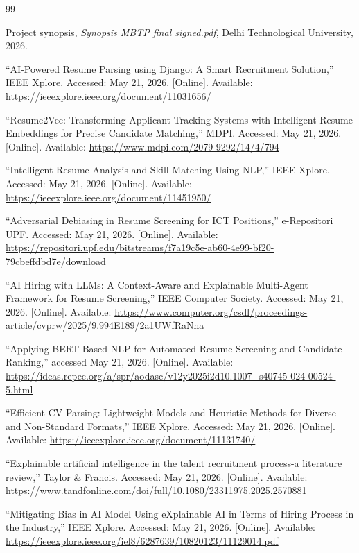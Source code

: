 \begin{thebibliography}{99}

Project synopsis, \textit{Synopsis MBTP final signed.pdf}, Delhi Technological University, 2026.

``AI-Powered Resume Parsing using Django: A Smart Recruitment Solution,'' IEEE Xplore. Accessed: May 21, 2026. [Online]. Available: \url{https://ieeexplore.ieee.org/document/11031656/}

``Resume2Vec: Transforming Applicant Tracking Systems with Intelligent Resume Embeddings for Precise Candidate Matching,'' MDPI. Accessed: May 21, 2026. [Online]. Available: \url{https://www.mdpi.com/2079-9292/14/4/794}

``Intelligent Resume Analysis and Skill Matching Using NLP,'' IEEE Xplore. Accessed: May 21, 2026. [Online]. Available: \url{https://ieeexplore.ieee.org/document/11451950/}

``Adversarial Debiasing in Resume Screening for ICT Positions,'' e-Repositori UPF. Accessed: May 21, 2026. [Online]. Available: \url{https://repositori.upf.edu/bitstreams/f7a19c5e-ab60-4e99-bf20-79cbeffdbd7e/download}

``AI Hiring with LLMs: A Context-Aware and Explainable Multi-Agent Framework for Resume Screening,'' IEEE Computer Society. Accessed: May 21, 2026. [Online]. Available: \url{https://www.computer.org/csdl/proceedings-article/cvprw/2025/9.994E189/2a1UWfRaNna}

``Applying BERT-Based NLP for Automated Resume Screening and Candidate Ranking,'' accessed May 21, 2026. [Online]. Available: \url{https://ideas.repec.org/a/spr/aodasc/v12y2025i2d10.1007_s40745-024-00524-5.html}

``Efficient CV Parsing: Lightweight Models and Heuristic Methods for Diverse and Non-Standard Formats,'' IEEE Xplore. Accessed: May 21, 2026. [Online]. Available: \url{https://ieeexplore.ieee.org/document/11131740/}

``Explainable artificial intelligence in the talent recruitment process-a literature review,'' Taylor \& Francis. Accessed: May 21, 2026. [Online]. Available: \url{https://www.tandfonline.com/doi/full/10.1080/23311975.2025.2570881}

``Mitigating Bias in AI Model Using eXplainable AI in Terms of Hiring Process in the Industry,'' IEEE Xplore. Accessed: May 21, 2026. [Online]. Available: \url{https://ieeexplore.ieee.org/iel8/6287639/10820123/11129014.pdf}


\end{thebibliography}
